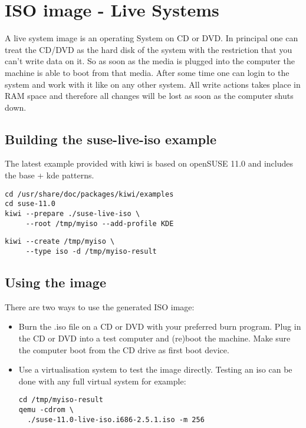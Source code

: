 \chapter{ISO image - Live Systems}
\label{chapter:iso}
\minitoc

A live system image is an operating System on CD or DVD. In principal
one can treat the CD/DVD as the hard disk of the system with the
restriction that you can't write data on it. So as soon as the media
is plugged into the computer the machine is able to boot from that
media. After some time one can login to the system and work with it
like on any other system. All write actions takes place in RAM space
and therefore all changes will be lost as soon as the computer shuts
down.

\section{Building the suse-live-iso example}

The latest example provided with kiwi is based on openSUSE 11.0 and
includes the base + kde patterns.

\begin{Command}{12cm}
\begin{verbatim}
cd /usr/share/doc/packages/kiwi/examples
cd suse-11.0
kiwi --prepare ./suse-live-iso \
     --root /tmp/myiso --add-profile KDE
\end{verbatim}
\end{Command}

\begin{Command}{12cm}
\begin{verbatim}
kiwi --create /tmp/myiso \
     --type iso -d /tmp/myiso-result
\end{verbatim}
\end{Command}

\section{Using the image}

There are two ways to use the generated ISO image:
\begin{itemize}
\item Burn the .iso file on a CD or DVD with your preferred burn program.
      Plug in the CD or DVD into a test computer and (re)boot the machine.
      Make sure the computer boot from the CD drive as first boot device.
\item Use a virtualisation system to test the image directly. Testing an
      iso can be done with any full virtual system for example:

      \begin{Command}{12cm}
      \begin{verbatim}
cd /tmp/myiso-result
qemu -cdrom \
  ./suse-11.0-live-iso.i686-2.5.1.iso -m 256
      \end{verbatim}
      \end{Command}
\end{itemize}

